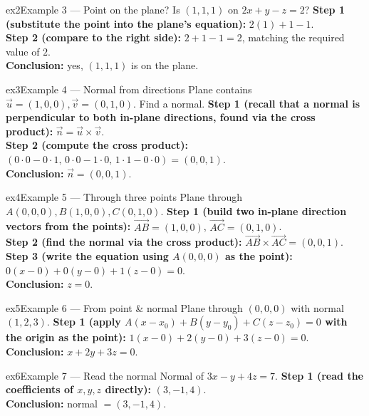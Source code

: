 \documentclass[11pt]{article}
\begin{document}
\begin{example}{ex2}{Example 3 --- Point on the plane?}
Is $(1,1,1)$ on $2x+y-z=2$?\soln
\textbf{Step 1 (substitute the point into the plane's equation):} $2(1)+1-1$.\\[3pt]
\textbf{Step 2 (compare to the right side):} $2+1-1=2$, matching the required value of $2$.\\[3pt]
\textbf{Conclusion:} yes, $(1,1,1)$ is on the plane.
\end{example}

\begin{example}{ex3}{Example 4 --- Normal from directions}
Plane contains $\vec u=(1,0,0),\vec v=(0,1,0)$. Find a normal.\soln
\textbf{Step 1 (recall that a normal is perpendicular to both in-plane directions, found via the cross product):} $\vec n=\vec u\times\vec v$.\\[3pt]
\textbf{Step 2 (compute the cross product):} $(0\cdot0-0\cdot1,\,0\cdot0-1\cdot0,\,1\cdot1-0\cdot0)=(0,0,1)$.\\[3pt]
\textbf{Conclusion:} $\vec n=(0,0,1)$.
\end{example}

\begin{example}{ex4}{Example 5 --- Through three points}
Plane through $A(0,0,0),B(1,0,0),C(0,1,0)$.\soln
\textbf{Step 1 (build two in-plane direction vectors from the points):} $\vec{AB}=(1,0,0)$, $\vec{AC}=(0,1,0)$.\\[3pt]
\textbf{Step 2 (find the normal via the cross product):} $\vec{AB}\times\vec{AC}=(0,0,1)$.\\[3pt]
\textbf{Step 3 (write the equation using $A(0,0,0)$ as the point):} $0(x-0)+0(y-0)+1(z-0)=0$.\\[3pt]
\textbf{Conclusion:} $z=0$.
\end{example}

\begin{example}{ex5}{Example 6 --- From point \& normal}
Plane through $(0,0,0)$ with normal $(1,2,3)$.\soln
\textbf{Step 1 (apply $A(x-x_0)+B(y-y_0)+C(z-z_0)=0$ with the origin as the point):} $1(x-0)+2(y-0)+3(z-0)=0$.\\[3pt]
\textbf{Conclusion:} $x+2y+3z=0$.
\end{example}

\begin{example}{ex6}{Example 7 --- Read the normal}
Normal of $3x-y+4z=7$.\soln
\textbf{Step 1 (read the coefficients of $x,y,z$ directly):} $(3,-1,4)$.\\[3pt]
\textbf{Conclusion:} normal $=(3,-1,4)$.
\end{example}
\end{document}
